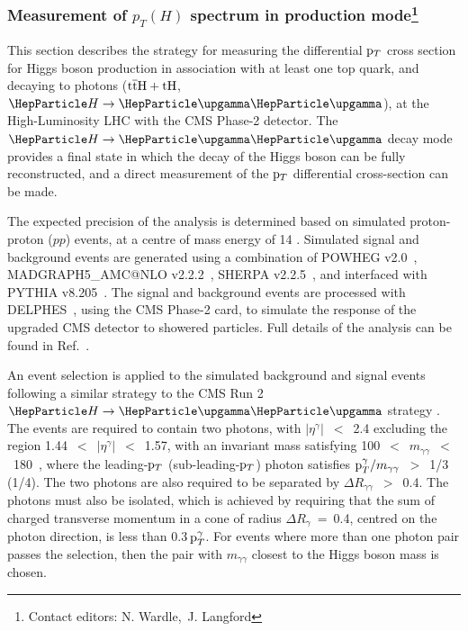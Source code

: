\subsubsection[Measurement of $p_{T}(H)$ spectrum  in \ttH production mode]{Measurement of $p_{T}(H)$ spectrum  in \ttH production mode\footnote{Contact editors: N. Wardle,~J. Langford}}
\label{sec:ttHdiffxs}

This section describes the strategy for measuring the differential $\mathrm{p}_{T}$ cross section for 
Higgs boson production in association with at least one top quark, and decaying to photons ($\text{t}\overline{\text{t}}\text{H}+\text{tH}$, $\hgg$), 
at the High-Luminosity LHC with the CMS Phase-2 detector. The $\hgg$ decay mode provides a final state in which the decay of the Higgs boson can be fully reconstructed, and a direct measurement of the $\mathrm{p}_{T}$ differential cross-section can be made. 

The expected precision of the analysis is determined based on simulated proton-proton ($pp$) events, at a centre of mass energy of 14 \UTeV.
Simulated signal and background events are generated using a combination of {\sc POWHEG}
v2.0~\cite{Alioli:2010xd,Nason:2009ai}, {\sc MADGRAPH5\_AMC@NLO} v2.2.2~\cite{Alwall:2014hca}, {\sc SHERPA} v2.2.5~\cite{Gleisberg:2008ta}, and interfaced with {\sc PYTHIA} v8.205~\cite{Sjostrand:2007gs}. The signal and background events are processed with {\sc DELPHES}~\cite{deFavereau:2013fsa}, using the CMS Phase-2 card, to simulate the response of the upgraded CMS detector to showered particles. Full details of the analysis can be found in Ref.~\cite{CMS-PAS-FTR-18-020}.


An event selection is applied to the simulated background and signal events following a similar strategy to the CMS Run 2 $\hgg$ strategy \cite{Sirunyan:2018ouh}. The events are required to contain two photons, with $|\eta^\gamma|$~$<$~2.4 excluding the region 1.44~$<$~$|\eta^\gamma|$~$<$~1.57, with an invariant mass satisfying 100~$<$~$m_{\gamma\gamma}$~$<$~180~\UGeV, where the leading-$\mathrm{p}_{T}$ (sub-leading-$\mathrm{p}_{T}$) photon satisfies $\mathrm{p}_{T}^{\gamma}/m_{\gamma\gamma}$~$>$~1/3 (1/4). The two photons are also required to be separated by $\Delta R_{\gamma\gamma}$~$>$~0.4. The photons must also be isolated, which is achieved by requiring that the sum of charged transverse momentum in a cone of radius $\Delta R_{\gamma}$~=~0.4, centred on the photon direction, is less than 0.3$\, \mathrm{p}_{T}^\gamma$. For events where more than one photon pair passes the selection, then the pair with $m_{\gamma\gamma}$ closest to the Higgs boson mass is chosen.

